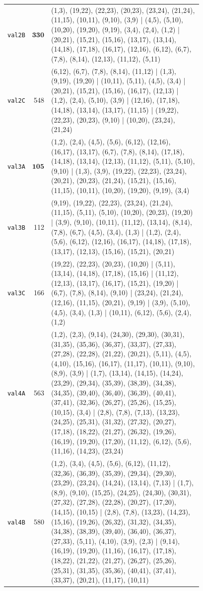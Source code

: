 \begin{landscape}
\begin{longtable}{lr>{\tiny\raggedright\arraybackslash}p{0.78\linewidth}}
\texttt{val2B} & $\mathbf{330}$ & (1,3), (19,22), (22,23), (20,23), (23,24), (21,24), (11,15), (10,11), (9,10), (3,9) | (4,5), (5,10), (10,20), (19,20), (9,19), (3,4), (2,4), (1,2) | (20,21), (15,21), (15,16), (13,17), (13,14), (14,18), (17,18), (16,17), (12,16), (6,12), (6,7), (7,8), (8,14), (12,13), (11,12), (5,11) \\[2pt]
\texttt{val2C} & 548 & (6,12), (6,7), (7,8), (8,14), (11,12) | (1,3), (9,19), (19,20) | (10,11), (5,11), (4,5), (3,4) | (20,21), (15,21), (15,16), (16,17), (12,13) | (1,2), (2,4), (5,10), (3,9) | (12,16), (17,18), (14,18), (13,14), (13,17), (11,15) | (19,22), (22,23), (20,23), (9,10) | (10,20), (23,24), (21,24) \\[2pt]
\texttt{val3A} & $\mathbf{105}$ & (1,2), (2,4), (4,5), (5,6), (6,12), (12,16), (16,17), (13,17), (6,7), (7,8), (8,14), (17,18), (14,18), (13,14), (12,13), (11,12), (5,11), (5,10), (9,10) | (1,3), (3,9), (19,22), (22,23), (23,24), (20,21), (20,23), (21,24), (15,21), (15,16), (11,15), (10,11), (10,20), (19,20), (9,19), (3,4) \\[2pt]
\texttt{val3B} & 112 & (9,19), (19,22), (22,23), (23,24), (21,24), (11,15), (5,11), (5,10), (10,20), (20,23), (19,20) | (3,9), (9,10), (10,11), (11,12), (13,14), (8,14), (7,8), (6,7), (4,5), (3,4), (1,3) | (1,2), (2,4), (5,6), (6,12), (12,16), (16,17), (14,18), (17,18), (13,17), (12,13), (15,16), (15,21), (20,21) \\[2pt]
\texttt{val3C} & 166 & (19,22), (22,23), (20,23), (10,20) | (5,11), (13,14), (14,18), (17,18), (15,16) | (11,12), (12,13), (13,17), (16,17), (15,21), (19,20) | (6,7), (7,8), (8,14), (9,10) | (23,24), (21,24), (12,16), (11,15), (20,21), (9,19) | (3,9), (5,10), (4,5), (3,4), (1,3) | (10,11), (6,12), (5,6), (2,4), (1,2) \\[2pt]
\texttt{val4A} & 563 & (1,2), (2,3), (9,14), (24,30), (29,30), (30,31), (31,35), (35,36), (36,37), (33,37), (27,33), (27,28), (22,28), (21,22), (20,21), (5,11), (4,5), (4,10), (15,16), (16,17), (11,17), (10,11), (9,10), (8,9), (3,9) | (1,7), (13,14), (14,15), (14,24), (23,29), (29,34), (35,39), (38,39), (34,38), (34,35), (39,40), (36,40), (36,39), (40,41), (37,41), (32,36), (26,27), (25,26), (15,25), (10,15), (3,4) | (2,8), (7,8), (7,13), (13,23), (24,25), (25,31), (31,32), (27,32), (20,27), (17,18), (18,22), (21,27), (26,32), (19,26), (16,19), (19,20), (17,20), (11,12), (6,12), (5,6), (11,16), (14,23), (23,24) \\[2pt]
\texttt{val4B} & 580 & (1,2), (3,4), (4,5), (5,6), (6,12), (11,12), (32,36), (36,39), (35,39), (29,34), (29,30), (23,29), (23,24), (14,24), (13,14), (7,13) | (1,7), (8,9), (9,10), (15,25), (24,25), (24,30), (30,31), (27,32), (27,28), (22,28), (20,27), (17,20), (14,15), (10,15) | (2,8), (7,8), (13,23), (14,23), (15,16), (19,26), (26,32), (31,32), (34,35), (34,38), (38,39), (39,40), (36,40), (36,37), (27,33), (5,11), (4,10), (3,9), (2,3) | (9,14), (16,19), (19,20), (11,16), (16,17), (17,18), (18,22), (21,22), (21,27), (26,27), (25,26), (25,31), (31,35), (35,36), (40,41), (37,41), (33,37), (20,21), (11,17), (10,11) \\[2pt]

\end{longtable}
\end{landscape}
